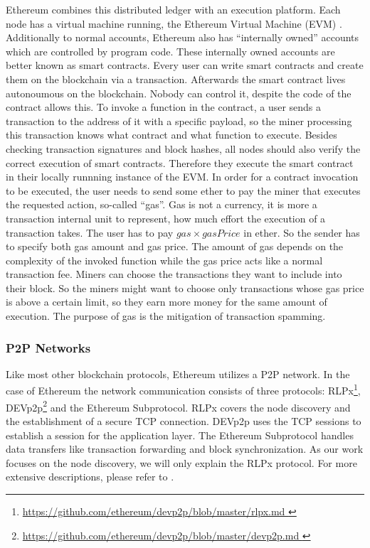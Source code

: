 \documentclass[10pt,conference,final]{IEEEtran}
\begin{document}
Ethereum combines this distributed ledger with an execution platform.
Each node has a virtual machine running, the Ethereum Virtual Machine (EVM) \cite{6}.
Additionally to normal accounts, Ethereum also has ``internally owned'' accounts which are controlled by program code.
These internally owned accounts are better known as smart contracts.
Every user can write smart contracts and create them on the blockchain via a transaction.
Afterwards the smart contract lives autonoumous on the blockchain.
Nobody can control it, despite the code of the contract allows this.
To invoke a function in the contract, a user sends a transaction to the address of it with a specific payload, so the miner processing this transaction knows what contract and what function to execute.
Besides checking transaction signatures and block hashes, all nodes should also verify the correct execution of smart contracts.
Therefore they execute the smart contract in their locally runnning instance of the EVM.
In order for a contract invocation to be executed, the user needs to send some ether to pay the miner that executes the requested action, so-called ``gas''.
Gas is not a currency, it is more a transaction internal unit to represent, how much effort the execution of a transaction takes.
The user has to pay \(gas \times gasPrice\) in ether.
So the sender has to specify both gas amount and gas price.
The amount of gas depends on the complexity of the invoked function while the gas price acts like a normal transaction fee.
Miners can choose the transactions they want to include into their block.
So the miners might want to choose only transactions whose gas price is above a certain limit, so they earn more money for the same amount of execution.
The purpose of gas is the mitigation of transaction spamming. \cite{12}

\vspace{1mm}

\subsubsection{P2P Networks}
\label{sec:P2P}
Like most other blockchain protocols, Ethereum utilizes a P2P network.
In the case of Ethereum the network communication consists of three protocols: RLPx\footnote{\url{https://github.com/ethereum/devp2p/blob/master/rlpx.md }}, DEVp2p\footnote{\url{https://github.com/ethereum/devp2p/blob/master/devp2p.md }} and the Ethereum Subprotocol.
RLPx covers the node discovery and the establishment of a secure TCP connection.
DEVp2p uses the TCP sessions to establish a session for the application layer.
The Ethereum Subprotocol handles data transfers like transaction forwarding and block synchronization.
As our work focuses on the node discovery, we will only explain the RLPx protocol.
For more extensive descriptions, please refer to \cite{13,14}.
\end{document}
